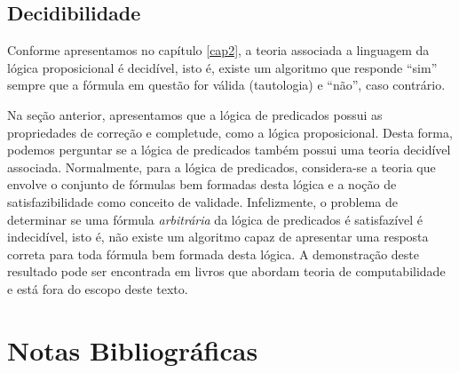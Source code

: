 \subsection{Decidibilidade}

Conforme apresentamos no capítulo \ref{cap2}, a teoria associada a
linguagem da lógica proposicional é decidível, isto é, existe um
algoritmo que responde ``sim'' sempre que a fórmula em questão for
válida (tautologia) e ``não'', caso contrário.

Na seção anterior, apresentamos que a lógica de predicados possui as
propriedades de correção e completude, como a lógica
proposicional. Desta forma, podemos perguntar se a lógica de predicados  também
possui uma teoria decidível associada. Normalmente, para a lógica de
predicados, considera-se a teoria que envolve o conjunto de fórmulas
bem formadas desta lógica e a noção de satisfazibilidade como conceito
de validade. Infelizmente, o problema de determinar se uma fórmula
\emph{arbitrária} da lógica de predicados é satisfazível é
indecidível, isto é, não existe um algoritmo capaz de apresentar uma
resposta correta para toda fórmula bem formada desta lógica. A
demonstração deste resultado pode ser encontrada em livros que abordam
teoria de computabilidade e está fora do escopo deste texto.

\section{Notas Bibliográficas}